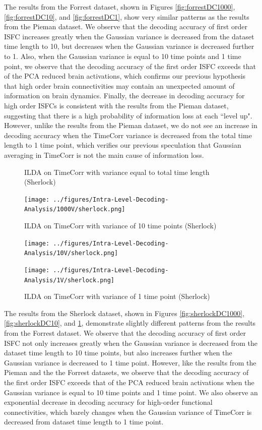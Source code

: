 \documentclass[11pt]{article}
\begin{document}
\begin{enumerate}
The results from the Forrest dataset, shown in Figures \ref{fig:forrestDC1000}, \ref{fig:forrestDC10}, and \ref{fig:forrestDC1}, show very similar patterns as the results from the Pieman dataset. We observe that the decoding accuracy of first order ISFC increases greatly when the Gaussian variance is decreased from the dataset time length to 10, but decreases when the Gaussian variance is decreased further to 1. Also, when the Gaussian variance is equal to 10 time points and 1 time point, we observe that the decoding accuracy of the first order ISFC exceeds that of the PCA reduced brain activations, which confirms our previous hypothesis that high order brain connectivities may contain an unexpected amount of information on brain dynamics. Finally, the decrease in decoding accuracy for high order ISFCs is consistent with the results from the Pieman dataset, suggesting that there is a high probability of information loss at each ``level up". However, unlike the results from the Pieman dataset, we do not see an increase in decoding accuracy when the TimeCorr variance is decreased from the total time length to 1 time point, which verifies our previous speculation that Gaussian averaging in TimeCorr is not the main cause of information loss.

\begin{figure}[!htb]
\caption{ILDA on TimeCorr with variance equal to total time length (Sherlock)}
\centering
\texttt{[image: ../figures/Intra-Level-Decoding-Analysis/1000V/sherlock.png]}
\label{fig:sherlockDC1000}
\caption{ILDA on TimeCorr with variance of 10 time points (Sherlock)}
\centering
\texttt{[image: ../figures/Intra-Level-Decoding-Analysis/10V/sherlock.png]}
\label{fig:sherlockDC10}
\caption{ILDA on TimeCorr with variance of 1 time point (Sherlock)}
\centering
\texttt{[image: ../figures/Intra-Level-Decoding-Analysis/1V/sherlock.png]}
\label{fig:sherlockDC1}
\end{figure}

The results from the Sherlock dataset, shown in Figures \ref{fig:sherlockDC1000}, \ref{fig:sherlockDC10}, and \ref{fig:sherlockDC1}, demonstrate slightly different patterns from the results from the Forrest dataset. We observe that the decoding accuracy of first order ISFC not only increases greatly when the Gaussian variance is decreased from the dataset time length to 10 time points, but also increases further when the Gaussian variance is decreased to 1 time point. However, like the results from the Pieman and the the Forrest datasets, we observe that the decoding accuracy of the first order ISFC exceeds that of the PCA reduced brain activations when the Gaussian variance is equal to 10 time points and 1 time point. We also observe an exponential decrease in decoding accuracy for high-order functional connectivities, which barely changes when the Gaussian variance of TimeCorr is decreased from dataset time length to 1 time point.


\end{enumerate}
\end{document}
